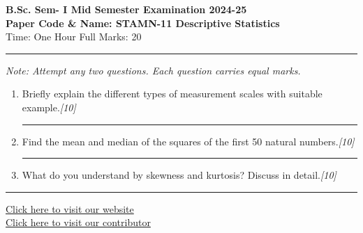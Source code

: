 \documentclass[11pt,a4paper]{article}
\newcommand{\pts}[1]{\hfill   \textit{[#1]}}
\begin{document}
\begin{center}
  {\large\bfseries B.Sc. Sem- I Mid Semester Examination 2024-25}\\[4pt]
  {\large\bfseries Paper Code \& Name: STAMN-11 Descriptive Statistics}\\[4pt]
  {\normalsize Time: One Hour \hfill Full Marks: 20}
\end{center}

\rule{\linewidth}{0.4pt}\smallskip



\noindent   \textit{Note: Attempt any two questions. Each question carries equal marks.}
\bigskip


\begin{enumerate}[label=\textbf{\arabic*.}, leftmargin=*]
  \item Briefly explain the different types of measurement scales with suitable example.\pts{10}

  \medskip\rule{\linewidth}{0.2pt}\medskip

  \item Find the mean and median of the squares of the first 50 natural numbers.\pts{10}

  \medskip\rule{\linewidth}{0.2pt}\medskip

  \item What do you understand by skewness and kurtosis? Discuss in detail.\pts{10}
\end{enumerate}

\vfill
\rule{\linewidth}{0.4pt}

\begin{center}\small
\href{https://bhu-exam.vercel.app/}{Click here to visit our website}\\[4pt]
\href{https://me-aryan.vercel.app/}{Click here to visit our contributor}
\end{center}
\end{document}
